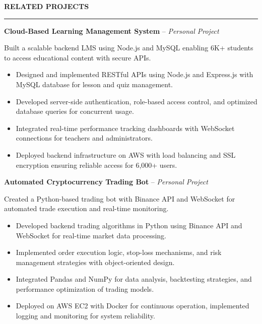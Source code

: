 \documentclass[10pt,letterpaper]{article}
\begin{document}
\vspace{6pt}

\textbf{RELATED PROJECTS}\\[-8pt]
\noindent\rule{\textwidth}{1pt}

\vspace{-2pt}

\textbf{Cloud-Based Learning Management System} -- \emph{Personal Project}

\vspace{-1pt}

Built a scalable backend LMS using Node.js and MySQL enabling 6K+ students to access educational content with secure APIs.
\vspace{-1pt}
\begin{itemize}
\item Designed and implemented RESTful APIs using Node.js and Express.js with MySQL database for lesson and quiz management.
\item Developed server-side authentication, role-based access control, and optimized database queries for concurrent usage.
\item Integrated real-time performance tracking dashboards with WebSocket connections for teachers and administrators.
\item Deployed backend infrastructure on AWS with load balancing and SSL encryption ensuring reliable access for 6,000+ users.
\end{itemize}

\textbf{Automated Cryptocurrency Trading Bot} -- \emph{Personal Project}

\vspace{-1pt}

Created a Python-based trading bot with Binance API and WebSocket for automated trade execution and real-time monitoring.
\vspace{-1pt}
\begin{itemize}
\item Developed backend trading algorithms in Python using Binance API and WebSocket for real-time market data processing.
\item Implemented order execution logic, stop-loss mechanisms, and risk management strategies with object-oriented design.
\item Integrated Pandas and NumPy for data analysis, backtesting strategies, and performance optimization of trading models.
\item Deployed on AWS EC2 with Docker for continuous operation, implemented logging and monitoring for system reliability.
\end{itemize}
\end{document}
